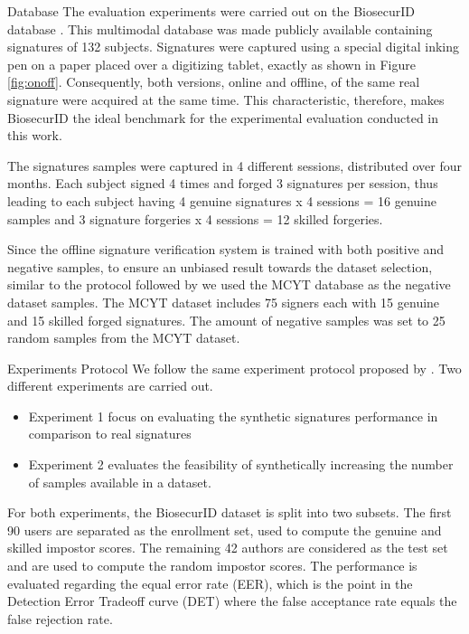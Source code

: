 \documentclass{beamer}
\begin{document}
\begin{frame}{Database}
The evaluation experiments were carried out on the BiosecurID database \cite{biosecurid}. This multimodal database was made publicly available containing signatures of 132 subjects. Signatures were captured using a special digital inking pen on a paper placed over a digitizing tablet, exactly as shown in Figure \ref{fig:onoff}. Consequently, both versions, online and offline, of the same real signature were acquired at the same time. This characteristic, therefore, makes BiosecurID the ideal benchmark for the experimental evaluation conducted in this work.


The signatures samples were captured in 4 different sessions, distributed over four months. Each subject signed 4 times and forged 3 signatures per session, thus leading to each subject having 4 genuine signatures x 4 sessions = 16 genuine samples and 3 signature forgeries x 4 sessions = 12 skilled forgeries.

Since the offline signature verification system is trained with both positive and negative samples, to ensure an unbiased result towards the dataset selection, similar to the protocol followed by \cite{diaz2014generation} we used the MCYT database \cite{mcyt-100} as the negative dataset samples. The MCYT dataset includes 75 signers each with 15 genuine and 15 skilled forged signatures. The amount of negative samples was set to 25 random samples from the MCYT dataset.
\end{frame}

\begin{frame}{Experiments Protocol}
We follow the same experiment protocol proposed by \cite{diaz2014generation}. 
Two different experiments are carried out. 

\begin{itemize}
\item Experiment 1 focus on evaluating the synthetic signatures performance in comparison to real signatures
\item Experiment 2 evaluates the feasibility of synthetically increasing the number of samples available in a dataset.
\end{itemize}

For both experiments, the BiosecurID dataset is split into two subsets. The first 90 users are separated as the enrollment set, used to compute the genuine and skilled impostor scores. The remaining 42 authors are considered as the test set and are used to compute the random impostor scores. The performance is evaluated regarding the equal error rate (EER), which is the point in the Detection Error Tradeoff curve (DET) where the false acceptance rate equals the false rejection rate.
\end{frame}
\end{document}

